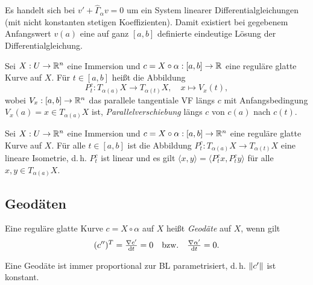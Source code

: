 \documentclass{cheat-sheet}
\begin{document}
\begin{bem}
  Es handelt sich bei $v' + \hat{\Gamma}_\alpha v = 0$ um ein System linearer Differentialgleichungen (mit nicht konstanten stetigen Koeffizienten). Damit existiert bei gegebenem Anfangswert $v(a)$ eine auf ganz $[a, b]$ definierte eindeutige Lösung der Differentialgleichung.
\end{bem}

\begin{defn}
  Sei $X : U \to \mathbb{R}^n$ eine Immersion und $c = X \circ \alpha : [a, b] \to \mathbb{R}$ eine reguläre glatte Kurve auf $X$. Für $t \in [a, b]$ heißt die Abbildung
  \[ P_t^c : T_{\alpha(a)} X \to T_{\alpha(t)} X, \quad x \mapsto V_x(t), \]
  wobei $V_x : [a, b] \to \mathbb{R}^n$ das parallele tangentiale VF längs $c$ mit Anfangsbedingung $V_x(a) = x \in T_{\alpha(a)} X$ ist, \emph{Parallelverschiebung} längs $c$ von $c(a)$ nach $c(t)$.
\end{defn}

\begin{samepage}

\begin{satz}
  Sei $X : U \to \mathbb{R}^n$ eine Immersion und $c = X \circ \alpha : [a, b] \to \mathbb{R}^n$ eine reguläre glatte Kurve auf $X$. Für alle $t \in [a, b]$ ist die Abbildung $P_t^c : T_{\alpha(a)} X \to T_{\alpha(t)} X$ eine lineare Isometrie, d.\,h. $P_t^c$ ist linear und es gilt $\langle x, y \rangle = \langle P_t^c x, P_t^c y \rangle$ für alle $x, y \in T_{\alpha(a)} X$.
\end{satz}


\subsection{Geodäten}

\end{samepage}

\begin{defn}
  Eine reguläre glatte Kurve $c = X \circ \alpha$ auf $X$ heißt \emph{Geodäte} auf $X$, wenn gilt
  \[ (c'')^T = \tfrac{\nabla c'}{\mathrm{d} t} = 0 \quad\text{bzw.}\quad \tfrac{\nabla \alpha'}{\mathrm{d} t} = 0. \]
\end{defn}

\begin{satz}
  Eine Geodäte ist immer proportional zur BL parametrisiert, d.\,h. $\lVert c'\rVert$ ist konstant.
\end{satz}
\end{document}
